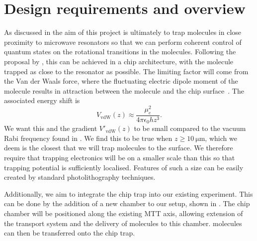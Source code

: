 \section{Design requirements and overview}

As discussed in  the aim of this project is ultimately to
trap molecules in close proximity to microwave resonators so that we can
perform coherent control of quantum states on the rotational transitions in the
molecules.
%
Following the proposal by , this can be achieved in a chip
architecture, with the molecule trapped as close to the resonator as possible.
%
The limiting factor will come from the Van der Waals force, where the
fluctuating electric dipole moment of the molecule results in attraction
between the molecule and the chip surface~\cite{}. The associated energy
shift is 
%
\begin{equation}
  V_\text{vdW}(z) \approx \frac{\mu_e^2}{4\pi\epsilon_0 h z^3}.
\end{equation}
%
We want this and the gradient $V'_\text{vdW}(z)$ to be small compared to the
vacuum Rabi frequency found in . We find this to
be true when $z\geq\SI{10}{\micro\meter}$, which we deem is the closest that we
will trap molecules to the surface.  We therefore require that trapping
electronics will be on a smaller scale than this so that trapping potential is
sufficiently localised.  Features of such a size can be easily created by
standard photolithography techniques.

Additionally, we aim to integrate the chip trap into our existing \CaF{}
experiment. This can be done by the addition of a new chamber to our setup,
shown in . The chip chamber will be
positioned along the existing MTT axis, allowing extension of the transport
system and the delivery of molecules to this chamber. \CaF{} molecules can then
be transferred onto the chip trap.

